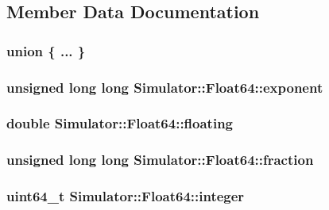 \subsection{Member Data Documentation}
\hypertarget{struct_simulator_1_1_float64_a4bfd4603aa9834dcc8b31432a1480f65}{\subsubsection[{"@68}]{\setlength{\rightskip}{0pt plus 5cm}union \{ ... \} }}\label{struct_simulator_1_1_float64_a4bfd4603aa9834dcc8b31432a1480f65}
\hypertarget{struct_simulator_1_1_float64_a9e24140d5ef2be7741e6b16a2ad49c49}{
\subsubsection[{exponent}]{\setlength{\rightskip}{0pt plus 5cm}unsigned long long Simulator\+::\+Float64\+::exponent}}\label{struct_simulator_1_1_float64_a9e24140d5ef2be7741e6b16a2ad49c49}
\hypertarget{struct_simulator_1_1_float64_ace414eeac7641e8724ac82a95aad288c}{
\subsubsection[{floating}]{\setlength{\rightskip}{0pt plus 5cm}double Simulator\+::\+Float64\+::floating}}\label{struct_simulator_1_1_float64_ace414eeac7641e8724ac82a95aad288c}
\hypertarget{struct_simulator_1_1_float64_a6cc3e310e4626f5031dfbe6c41247412}{
\subsubsection[{fraction}]{\setlength{\rightskip}{0pt plus 5cm}unsigned long long Simulator\+::\+Float64\+::fraction}}\label{struct_simulator_1_1_float64_a6cc3e310e4626f5031dfbe6c41247412}
\hypertarget{struct_simulator_1_1_float64_a5f289ccbab79d5a83db374ae64465d12}{
\subsubsection[{integer}]{\setlength{\rightskip}{0pt plus 5cm}uint64\+\_\+t Simulator\+::\+Float64\+::integer}}\label{struct_simulator_1_1_float64_a5f289ccbab79d5a83db374ae64465d12}
